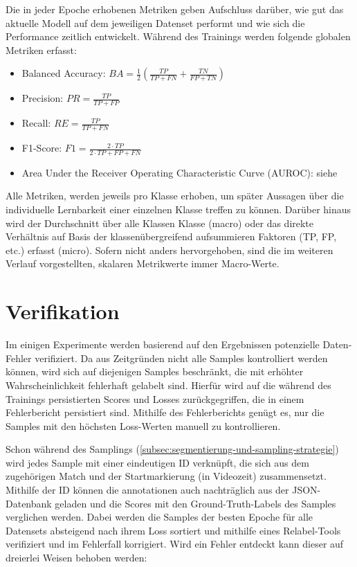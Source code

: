 Die in jeder Epoche erhobenen Metriken geben Aufschluss darüber, wie gut das aktuelle Modell auf dem jeweiligen Datenset performt und wie sich die Performance zeitlich entwickelt.
Während des Trainings werden folgende globalen Metriken erfasst:

\begin{itemize}
    \item Balanced Accuracy: $BA = \frac{1}{2} ( \frac{TP}{TP + FN} + \frac{TN}{FP + TN} )$
    \item Precision: $PR = \frac{TP}{TP+FP}$
    \item Recall: $RE = \frac{TP}{TP+FN}$
    \item F1-Score: $F1 = \frac{2 \cdot TP}{2 \cdot TP + FP + FN}$
    \item Area Under the Receiver Operating Characteristic Curve (AUROC): siehe~\cite{Hand01}
\end{itemize}

Alle Metriken, werden jeweils pro Klasse erhoben, um später Aussagen über die individuelle Lernbarkeit einer einzelnen Klasse treffen zu können.
Darüber hinaus wird der Durchschnitt über alle Klassen Klasse (macro) oder das direkte Verhältnis auf Basis der klassenübergreifend aufsummieren Faktoren (TP, FP, etc.) erfasst (micro).
Sofern nicht anders hervorgehoben, sind die im weiteren Verlauf vorgestellten, skalaren Metrikwerte immer Macro-Werte.

\section{Verifikation}
\label{sec:nachgang}

Im einigen Experimente werden basierend auf den Ergebnissen potenzielle Daten-Fehler verifiziert.
Da aus Zeitgründen nicht alle Samples kontrolliert werden können, wird sich auf diejenigen Samples beschränkt, die mit erhöhter Wahrscheinlichkeit fehlerhaft gelabelt sind.
Hierfür wird auf die während des Trainings persistierten Scores und Losses zurückgegriffen, die in einem Fehlerbericht persistiert sind.
Mithilfe des Fehlerberichts genügt es, nur die Samples mit den höchsten Loss-Werten manuell zu kontrollieren.

Schon während des Samplings (\autoref{subsec:segmentierung-und-sampling-strategie}) wird jedes Sample mit einer eindeutigen ID verknüpft, die sich aus dem zugehörigen Match und der Startmarkierung (in Videozeit) zusammensetzt.
Mithilfe der ID können die \gls{annotationen} auch nachträglich aus der JSON-Datenbank geladen und die Scores mit den Ground-Truth-Labels des Samples verglichen werden.
Dabei werden die Samples der besten Epoche für alle Datensets absteigend nach ihrem Loss sortiert und mithilfe eines Relabel-Tools verifiziert und im Fehlerfall korrigiert.
Wird ein Fehler entdeckt kann dieser auf dreierlei Weisen behoben werden:


